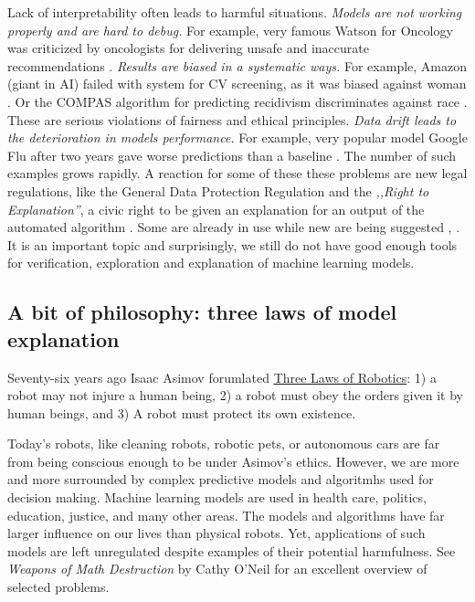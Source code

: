 \documentclass[]{krantz}
\theoremstyle{definition}
\theoremstyle{definition}
\theoremstyle{definition}
\theoremstyle{remark}
\begin{document}
Lack of interpretability often leads to harmful situations. \emph{Models
are not working properly and are hard to debug.} For example, very
famous Watson for Oncology was criticized by oncologists for delivering
unsafe and inaccurate recommendations \citep{IBMWatson}. \emph{Results
are biased in a systematic ways.} For example, Amazon (giant in AI)
failed with system for CV screening, as it was biased against woman
\citep{AmazonAI}. Or the COMPAS algorithm for predicting recidivism
discriminates against race \citep{COMPAS}. These are serious violations
of fairness and ethical principles. \emph{Data drift leads to the
deterioration in models performance.} For example, very popular model
Google Flu after two years gave worse predictions than a baseline
\citep{GoogleFLU}. The number of such examples grows rapidly. A reaction
for some of these these problems are new legal regulations, like the
General Data Protection Regulation \citep{EUGDPR} and the \emph{,,Right
to Explanation''}, a civic right to be given an explanation for an
output of the automated algorithm \citep{RightToExpl}. Some are already
in use while new are being suggested \citep{RightToExpl2},
\citep{RightToExpl3}. It is an important topic and surprisingly, we
still do not have good enough tools for verification, exploration and
explanation of machine learning models.

\hypertarget{three-single-laws}{%
\subsection{A bit of philosophy: three laws of model
explanation}\label{three-single-laws}}

Seventy-six years ago Isaac Asimov forumlated
\href{https://en.wikipedia.org/wiki/Three_Laws_of_Robotics}{Three Laws
of Robotics}: 1) a robot may not injure a human being, 2) a robot must
obey the orders given it by human beings, and 3) A robot must protect
its own existence.

Today's robots, like cleaning robots, robotic pets, or autonomous cars
are far from being conscious enough to be under Asimov's ethics.
However, we are more and more surrounded by complex predictive models
and algoritmhs used for decision making. Machine learning models are
used in health care, politics, education, justice, and many other areas.
The models and algorithms have far larger influence on our lives than
physical robots. Yet, applications of such models are left unregulated
despite examples of their potential harmfulness. See \emph{Weapons of
Math Destruction} by Cathy O'Neil \citep{ONeil} for an excellent
overview of selected problems.
\end{document}
